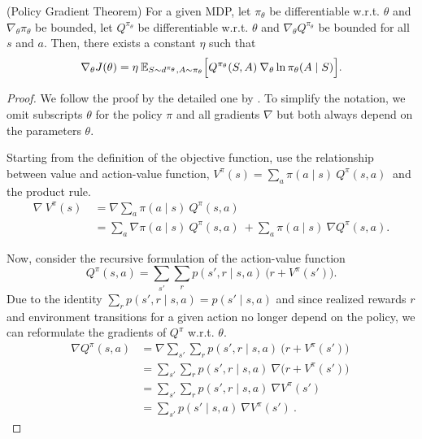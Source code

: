 \begin{theorem} \label{pg_theorem}
	(Policy Gradient Theorem)
	For a given MDP, let \(\pi_\theta\) be differentiable w.r.t. \(\theta\) and \(\nabla_\theta \pi_\theta\) be bounded, let \(Q^{\pi_\theta}\) be differentiable w.r.t. \(\theta\) and \(\nabla_\theta Q^{\pi_\theta}\) be bounded for all \(s\) and \(a\). Then, there exists a constant \(\eta\) such that
	\begin{equation}
		\nabla_\theta J(\theta) = \eta \: \mathbb{E}_{S \sim d^{\pi_\theta}, A \sim \pi_\theta} \Bigl[ Q^{\pi_\theta}(S,A) \: \nabla_\theta \ln \pi_\theta(A \mid S) \Bigr]. \label{eq:pg_theorem}
	\end{equation}
\end{theorem}
\begin{proof}
	We follow the proof by \cite{Sutton1998} the detailed one by \cite{lehmann2024definitiveguidepolicygradients}.
	To simplify the notation, we omit subscripts \(\theta\) for the policy \(\pi\) and all gradients \(\nabla\) but both always depend on the parameters \(\theta\).
	
	Starting from the definition of the objective function, use the relationship between value and action-value function, 
	\( V^\pi (s) = \sum_{a} \pi(a \mid s) \: Q^\pi (s, a) \: \) 
	and the product rule.
	\begin{align}
		\nabla \: V^\pi(s) \: &= \nabla \sum_{a} \pi(a \mid s) \: Q^\pi(s,a) \: \nonumber \\
		&= \sum_{a} \nabla \pi(a \mid s) \: Q^\pi(s,a) \: + \sum_{a} \pi(a \mid s) \: \nabla Q^\pi(s,a) . \label{eq:pgproof_1}
	\end{align}
	
	Now, consider the recursive formulation of the action-value function 
	\[Q^\pi(s,a) = \sum_{s'} \sum_{r} p(s', r \mid s,a) \: \bigl(r + V^\pi(s')\bigr) .\]
	Due to the identity \(\sum_{r} p(s', r \mid s,a) = p(s' \mid s,a)\) and since realized rewards \(r\) and environment transitions for a given action no longer depend on the policy, we can reformulate the gradients of \(Q^\pi\) w.r.t. \(\theta\).
	\begin{align}
		\nabla Q^\pi(s,a) &= \nabla \sum_{s'} \sum_{r} p(s', r \mid s,a) \: \bigl(r + V^\pi(s')\bigr) \: \nonumber \\
		&= \sum_{s'} \sum_{r} p(s', r \mid s,a) \: \nabla \bigl(r + V^\pi(s')\bigr) \: \nonumber \\ 
		&= \sum_{s'} \sum_{r} p(s', r \mid s,a) \: \nabla V^\pi(s') \: \nonumber \\ 
		&= \sum_{s'} p(s' \mid s,a) \: \nabla V^\pi(s') \: \label{eq:pgproof_2}.
	\end{align}
	

\end{proof}
